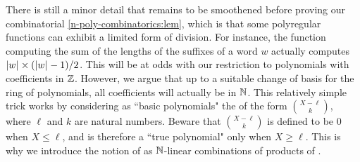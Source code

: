 \AP There is still a minor detail that remains to be smoothened before proving
our combinatorial \cref{n-poly-combinatorics:lem}, which is that some
polyregular functions can exhibit a limited form of division. For instance, the
function computing the sum of the lengths of the suffixes of a word $w$
actually computes $\card{w} \times (\card{w} - 1) / 2$. This will be at odds
with our restriction to polynomials with coefficients in $\mathbb{Z}$. However, we
argue that up to a suitable change of basis for the ring of polynomials, all
coefficients will actually be in $\mathbb{N}$. This relatively simple trick works by
considering as ``basic polynomials" the  of the form
$\binom{X - \ell}{k}$, where $\ell$ and $k$ are natural numbers. Beware that
$\binom{X - \ell}{k}$ is defined to be $0$ when $X \leq \ell$, and is therefore
a ``true polynomial" only when $X \geq \ell$. This is why we introduce the
notion of  as $\mathbb{N}$-linear combinations of
products of .


